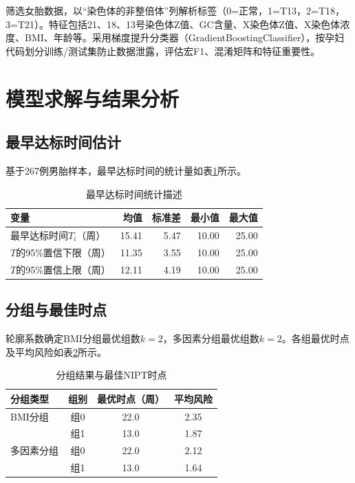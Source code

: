 \documentclass[12pt,a4paper]{article}
\begin{document}
筛选女胎数据，以“染色体的非整倍体”列解析标签（0=正常，1=T13，2=T18，3=T21）。特征包括21、18、13号染色体Z值、GC含量、X染色体Z值、X染色体浓度、BMI、年龄等。采用梯度提升分类器（GradientBoostingClassifier），按孕妇代码划分训练/测试集防止数据泄露，评估宏F1、混淆矩阵和特征重要性。

\section{模型求解与结果分析}

\subsection{最早达标时间估计}

基于267例男胎样本，最早达标时间的统计量如表\ref{tab:T_stats}所示。

\begin{table}[htbp]
\centering
\caption{最早达标时间统计描述}
\label{tab:T_stats}
\begin{tabular}{lrrrr}
\toprule
变量 & 均值 & 标准差 & 最小值 & 最大值 \\
\midrule
最早达标时间$T_i$（周） & 15.41 & 5.47 & 10.00 & 25.00 \\
$T$的95\%置信下限（周） & 11.35 & 3.55 & 10.00 & 25.00 \\
$T$的95\%置信上限（周） & 12.11 & 4.19 & 10.00 & 25.00 \\
\bottomrule
\end{tabular}
\end{table}

\subsection{分组与最佳时点}

轮廓系数确定BMI分组最优组数$k=2$，多因素分组最优组数$k=2$。各组最优时点及平均风险如表\ref{tab:groups}所示。

\begin{table}[htbp]
\centering
\caption{分组结果与最佳NIPT时点}
\label{tab:groups}
\begin{tabular}{lccc}
\toprule
分组类型 & 组别 & 最优时点（周） & 平均风险 \\
\midrule
BMI分组 & 组0 & 22.0 & 2.35 \\
 & 组1 & 13.0 & 1.87 \\
多因素分组 & 组0 & 22.0 & 2.12 \\
 & 组1 & 13.0 & 1.64 \\
\bottomrule
\end{tabular}
\end{table}
\end{document}
